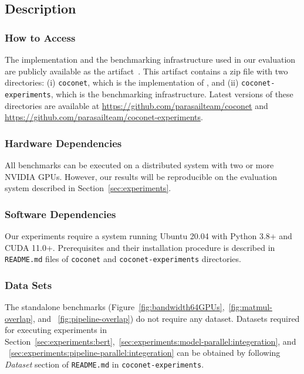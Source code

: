 \subsection{Description}

\subsubsection{How to Access}

The \tool{} implementation and the benchmarking infrastructure used in our evaluation are publicly available as the artifact~\cite{coconet-artifact}. 
This artifact contains a zip file with two directories: (i) \texttt{coconet}, which is the implementation of \tool{}, and (ii) \texttt{coconet-experiments}, which is the benchmarking infrastructure.
Latest versions of these directories are available at \url{https://github.com/parasailteam/coconet} and \url{https://github.com/parasailteam/coconet-experiments}.

\subsubsection{Hardware Dependencies}
All benchmarks can be executed on a distributed system with two or more NVIDIA GPUs.
However, our results will be reproducible on the evaluation system described in Section~\ref{sec:experiments}.

\subsubsection{Software Dependencies}
Our experiments require a system running Ubuntu 20.04 with Python 3.8+ and CUDA 11.0+.
Prerequisites and their installation procedure is described in \texttt{README.md} files of \texttt{coconet} and \texttt{coconet-experiments} directories.

\subsubsection{Data Sets}
The standalone benchmarks (Figure~\ref{fig:bandwidth64GPUs},~\ref{fig:matmul-overlap}, and ~\ref{fig:pipeline-overlap}) do not require any dataset.
Datasets required for executing experiments in Section~\ref{sec:experiments:bert},~\ref{sec:experiments:model-parallel:integeration}, and ~\ref{sec:experiments:pipeline-parallel:integeration} can be obtained by following \textit{Dataset} section of \texttt{README.md} in \texttt{coconet-experiments}.
